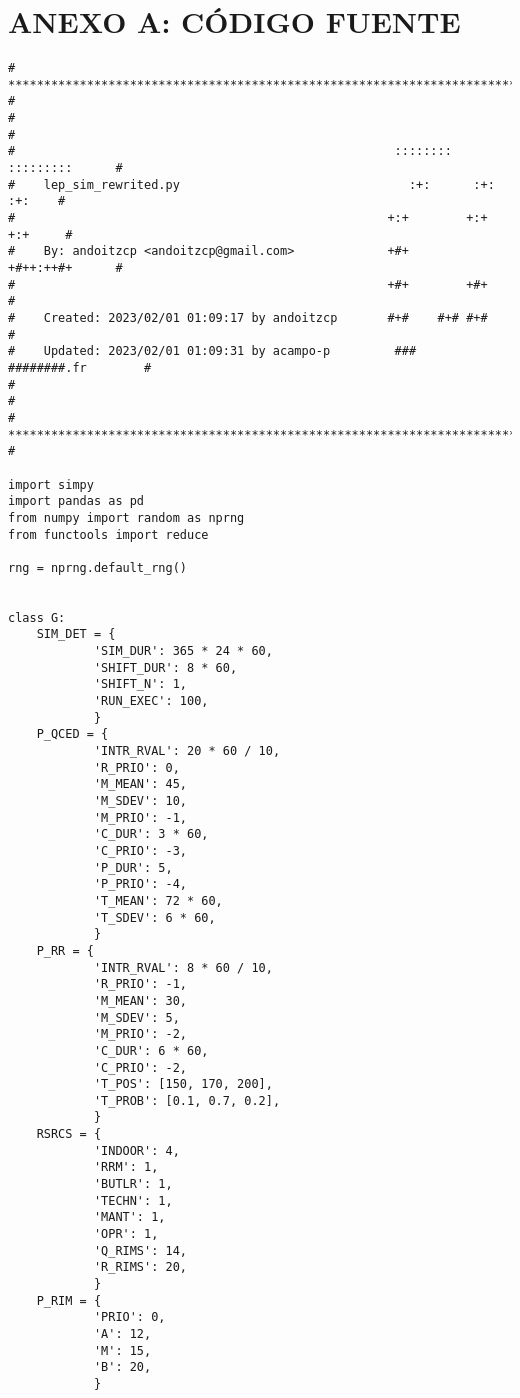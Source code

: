 \appendix
\section{ANEXO A: CÓDIGO FUENTE}\label{apnd2}

\begin{verbatim}
# **************************************************************************** #
#                                                                              #
#                                                     ::::::::  :::::::::      #
#    lep_sim_rewrited.py                                :+:      :+:    :+:    #
#                                                    +:+        +:+    +:+     #
#    By: andoitzcp <andoitzcp@gmail.com>             +#+        +#++:++#+      #
#                                                    +#+        +#+            #
#    Created: 2023/02/01 01:09:17 by andoitzcp       #+#    #+# #+#            #
#    Updated: 2023/02/01 01:09:31 by acampo-p         ###   ########.fr        #
#                                                                              #
# **************************************************************************** #

import simpy
import pandas as pd
from numpy import random as nprng
from functools import reduce

rng = nprng.default_rng()


class G:
    SIM_DET = {
            'SIM_DUR': 365 * 24 * 60,
            'SHIFT_DUR': 8 * 60,
            'SHIFT_N': 1,
            'RUN_EXEC': 100,
            }
    P_QCED = {
            'INTR_RVAL': 20 * 60 / 10,
            'R_PRIO': 0,
            'M_MEAN': 45,
            'M_SDEV': 10,
            'M_PRIO': -1,
            'C_DUR': 3 * 60,
            'C_PRIO': -3,
            'P_DUR': 5,
            'P_PRIO': -4,
            'T_MEAN': 72 * 60,
            'T_SDEV': 6 * 60,
            }
    P_RR = {
            'INTR_RVAL': 8 * 60 / 10,
            'R_PRIO': -1,
            'M_MEAN': 30,
            'M_SDEV': 5,
            'M_PRIO': -2,
            'C_DUR': 6 * 60,
            'C_PRIO': -2,
            'T_POS': [150, 170, 200],
            'T_PROB': [0.1, 0.7, 0.2],
            }
    RSRCS = {
            'INDOOR': 4,
            'RRM': 1,
            'BUTLR': 1,
            'TECHN': 1,
            'MANT': 1,
            'OPR': 1,
            'Q_RIMS': 14,
            'R_RIMS': 20,
            }
    P_RIM = {
            'PRIO': 0,
            'A': 12,
            'M': 15,
            'B': 20,
            }



\end{verbatim}
